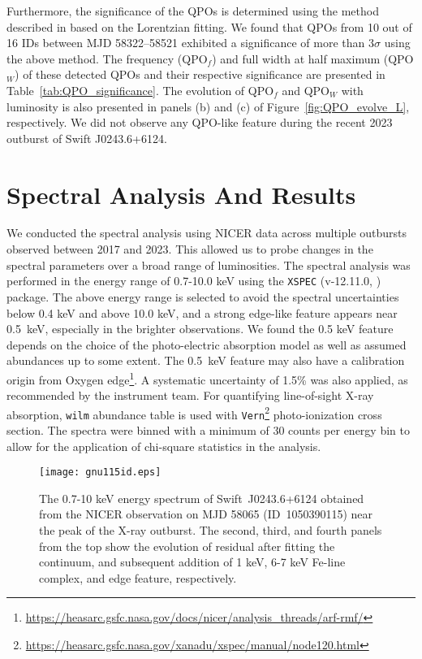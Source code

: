 \documentclass[twocolumn,trackchanges]{aastex631}
\begin{document}
Furthermore, the significance of the QPOs is determined using the method described in \citet{2010MNRAS.401.1290B} based on the Lorentzian fitting. We found that QPOs from  10 out of 16 IDs  between MJD 58322--58521 exhibited a significance of more than $3\sigma$ using the above method. The frequency (QPO$_{f}$) and full width at half maximum (QPO$_{W}$) of these detected QPOs and their respective significance are presented in Table~\ref{tab:QPO_significance}. The evolution of QPO$_{f}$ and QPO$_{W}$ with luminosity is also presented in panels (b)  and (c)  of Figure~\ref{fig:QPO_evolve_L}, respectively. We did not observe any QPO-like feature during the recent 2023 outburst of Swift J0243.6+6124.



\section{Spectral Analysis And Results}
\label{sec:4}




We conducted the spectral analysis using NICER data across multiple outbursts observed between 2017 and 2023. This allowed us to probe changes in the spectral parameters over a broad range of luminosities. The spectral analysis was performed in the energy range of 0.7-10.0 keV using the \texttt{XSPEC} (v-12.11.0, \citealt{1996ASPC..101...17A}) package. The above energy range is selected to avoid the spectral uncertainties below 0.4 keV and above 10.0 keV, and a strong edge-like feature appears near 0.5~keV, especially in the brighter observations. We found the 0.5 keV feature depends on the choice of the photo-electric absorption model as well as assumed abundances up to some extent. The 0.5~keV feature may also have a calibration origin from Oxygen edge\footnote{\url{https://heasarc.gsfc.nasa.gov/docs/nicer/analysis_threads/arf-rmf/}}. A systematic uncertainty of 1.5\% was also applied, as recommended by the instrument team. For quantifying line-of-sight X-ray absorption, \texttt{wilm} abundance table \citep{2000ApJ...542..914W}  is used with \texttt{Vern}\footnote{\url{https://heasarc.gsfc.nasa.gov/xanadu/xspec/manual/node120.html}} photo-ionization cross section. The spectra were binned with a minimum of 30 counts per energy bin to allow for the application of chi-square statistics in the analysis.

\begin{figure}
    \hspace{-0.9cm}
    \texttt{[image: gnu115id.eps]}
    \caption{  The 0.7-10 keV energy spectrum of Swift~J0243.6+6124 obtained from the NICER observation on MJD 58065 (ID~1050390115) near the peak of the X-ray outburst. The second, third, and fourth panels from the top show the evolution of residual after fitting the continuum, and subsequent addition of 1 keV,  6-7 keV Fe-line complex, and edge feature, respectively.} 
   \label{fig:114id}
\end{figure}
\end{document}

